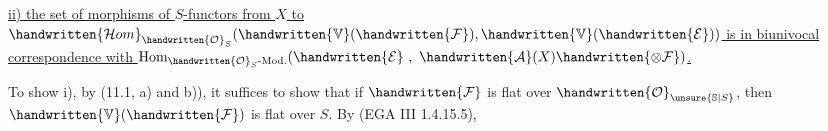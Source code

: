 \uline{ii) the set of morphisms of $S$-functors from $X$ to $\handwritten{\mathcal{H}om}_{\handwritten{\mathcal{O}}_S}(\handwritten{\mathbb{V}}(\handwritten{\mathcal{F}}),\handwritten{\mathbb{V}}(\handwritten{\mathcal{E}}))$ is in biunivocal correspondence with $\operatorname{Hom}_{\handwritten{\mathcal{O}}_S\text{-}\mathrm{Mod.}}(\handwritten{\mathcal{E}}\ ,\ \handwritten{\mathcal{A}}(X)\handwritten{\otimes\mathcal{F}})$.}

To show i), by (11.1, a) and b)), it suffices to show that if $\handwritten{\mathcal{F}}$ is flat over $\handwritten{\mathcal{O}}_{\unsure{\mathbb{S}|S}}$,  then $\handwritten{\mathbb{V}}(\handwritten{\mathcal{F}})$ is flat over $S$. By (EGA III 1.4.15.5),
